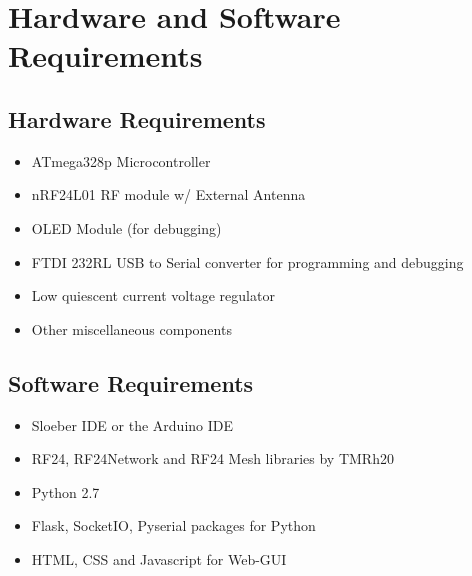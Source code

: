 \chapter{Hardware and Software Requirements}

\section{Hardware Requirements}
\begin{itemize}
\item ATmega328p Microcontroller
\item nRF24L01 RF module w/ External Antenna
\item OLED Module (for debugging)
\item FTDI 232RL USB to Serial converter for programming and debugging
\item Low quiescent current voltage regulator
\item Other miscellaneous components
\end{itemize}

\section{Software Requirements}
\begin{itemize}
	\item Sloeber IDE or the Arduino IDE 
	\item RF24, RF24Network and RF24 Mesh libraries by TMRh20
	\item Python 2.7
	\item Flask, SocketIO, Pyserial packages for Python
	\item HTML, CSS and Javascript for Web-GUI
\end{itemize}